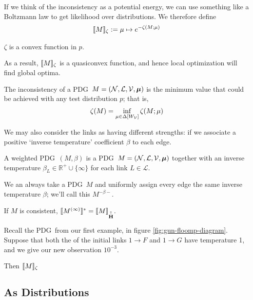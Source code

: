 \documentclass{article}
\newcommand\changeoff{\color{black} }
\newcommand\MaxEnt{{\overset{\uparrow}{\mathbf H}}}
\newcommand\bmu{\boldsymbol{\mu}}
\newcommand{\MN}{PDG}
\begin{document}
	If we think of the inconsistency as a potential energy, we can use something like a Boltzmann law to get likelihood over distributions. We therefore define	
	\[\llbracket M\rrbracket_\zeta := \mu \mapsto e^{-\zeta(M;\mu)}\]


	\begin{prop}[restate=thmzetaconvex]
		$\zeta$ is a convex function in $p$.
	\end{prop}
	As a result, $\llbracket M\rrbracket_\zeta$ is a quasiconvex function, and hence local optimization will find global optima.

	\begin{defn}
		The inconsistency of a \MN\ $M = (\cal N, L, V, \bmu)$ is the minimum value that could be achieved with any test distribution $p$; that is, 
		\[ \zeta(M) = \inf_{ \mu \in \Delta [W_{\cal V}]} \zeta (M; \mu) 
			 \]
		
	\end{defn}


	We may also consider the links as having different strengths: if we associate a positive `inverse temperature' coefficient $\beta$ to each edge.
	
	\begin{defn}
		A weighted \MN\ $(M, \beta)$ is a \MN\ $M = (\cal N, L, V, \bmu)$ together with an inverse temperature $\beta_L \in \mathbb R^+ \cup \{\infty\}$ for each link $L \in \mathcal L$.
	\end{defn}

	We an always take a \MN\ $M$ and uniformly assign every edge the same inverse temperature $\beta$; we'll call this $M^{-\beta-}$.
	
	\begin{prop}
		If $M$ is consistent, $\bbr{M^{(\infty)}}^* = \bbr{M}_\MaxEnt$.
	\end{prop}


	\begin{example}[continues=ex:guns-and-floomps]
		Recall the \MN\ from our first example, in figure \ref{fig:gun-floomp-diagram}. Suppose that both the of the initial links $1 \to F$ and $1\to G$ have temperature 1, and we give our new observation $10^{-3}$.
		
		Then $\llbracket M\rrbracket_\zeta$
		\todo{}
	\end{example}	
	
	
	\changeoff
	
	\subsection{As Distributions}
	
\end{document}
